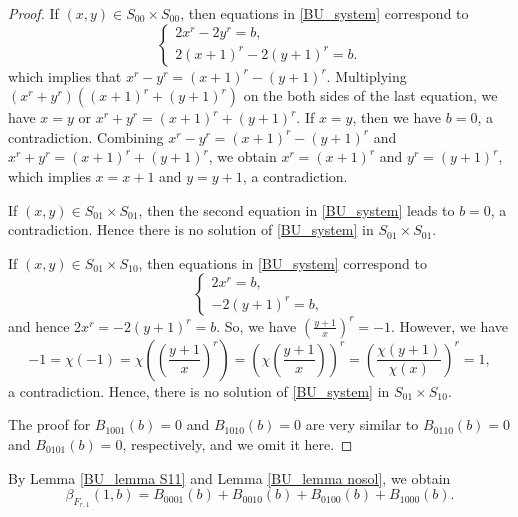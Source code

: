 \documentclass[11pt]{article}
\numberwithin{theorem}{section}
\begin{document}
\begin{proof}
If $(x,y)\in S_{00}\times S_{00}$, then equations in \eqref{BU_system} correspond to 
\begin{equation*}
	\begin{cases}
		2x^r-2y^r=b,\\
		2(x+1)^r-2(y+1)^r=b.
	\end{cases}
\end{equation*}
which implies that $x^r-y^r=(x+1)^r-(y+1)^r$. Multiplying $(x^r+y^r)\left( (x+1)^r+(y+1)^r\right)$ on the both sides of the last equation, we have
$x=y$ or $x^r+y^r=(x+1)^r+(y+1)^r$. If $x=y$, then we have $b=0$, a contradiction. Combining $x^r-y^r = (x+1)^r-(y+1)^r$ and $x^r+y^r = (x+1)^r+(y+1)^r$, we obtain $x^r = (x+1)^r$ and $y^r = (y+1)^r$, which implies $x=x+1$ and $y=y+1$, a contradiction.

If $(x,y)\in S_{01}\times S_{01}$, then the second equation in \eqref{BU_system} leads to $b=0$, a contradiction. Hence there is no solution of \eqref{BU_system} in $S_{01}\times S_{01}$.

If $(x,y)\in S_{01}\times S_{10}$, then equations in \eqref{BU_system} correspond to 
\begin{equation}\label{BU_system S0110}
	\begin{cases}
		2x^r=b,\\
		-2(y+1)^r=b,
	\end{cases}
\end{equation}
and hence $2x^r=-2(y+1)^r=b$. So, we have $\left( \frac{y+1}{x}\right) ^r=-1$. However, we have
\begin{equation*}
	-1=\chi(-1)=\chi\left( \left( \frac{y+1}{x}\right)^r \right) = \left( \chi\left( \frac{y+1}{x}\right) \right) ^r  = \left(\frac{\chi(y+1)}{\chi(x)} \right)^r=1, 
\end{equation*}
a contradiction. Hence, there is no solution of \eqref{BU_system} in $S_{01}\times S_{10}$.

The proof for $B_{1001}(b)=0$ and $B_{1010}(b)=0$ are very similar to $B_{0110}(b)=0$ and $B_{0101}(b)=0$, respectively, and we omit it here.
\end{proof}





By Lemma \ref{BU_lemma S11} and Lemma \eqref{BU_lemma nosol}, we obtain 
\begin{equation}\label{beta1b_eqn}
	\beta_{F_{r,1}}(1,b)=B_{0001}(b)+B_{0010}(b)+B_{0100}(b)+B_{1000}(b).
\end{equation}
\end{document}
